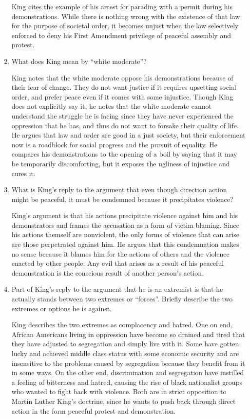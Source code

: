 \documentclass{article}
\begin{document}
\begin{enumerate}
  \par King cites the example of his arrest for parading with a permit during his demonstrations. While there is nothing wrong with the existence of that law for the purpose of societal order, it becomes unjust when the law selectively enforced to deny his First Amendment privilege of peaceful assembly and protest.
  \item What does King mean by ``white moderate''?
  \par King notes that the white moderate oppose his demonstrations because of their fear of change. They do not want justice if it requires upsetting social order, and prefer peace even if it comes with some injustice. Though King does not explicitly say it, he notes that the white moderate cannot understand the struggle he is facing since they have never experienced the oppression that he has, and thus do not want to forsake their quality of life. He argues that law and order are good in a just society, but their enforcement now is a roadblock for social progress and the pursuit of equality. He compares his demonstrations to the opening of a boil by saying that it may be temporarily discomforting, but it exposes the ugliness of injustice and cures it.
  \item What is King's reply to the argument that even though direction action might be peaceful, it must be condemned because it precipitates violence?
  \par King's argument is that his actions precipitate violence against him and his demonstrators and frames the accusation as a form of victim blaming. Since his actions themself are nonviolent, the only forms of violence that can arise are those perpetrated against him. He argues that this condemnation makes no sense because it blames him for the actions of others and the violence enacted by other people. Any evil that arises as a result of his peaceful demonstration is the conscious result of another person's action.
  \item Part of King's reply to the argument that he is an extremist is that he actually stands between two extremes or ``forces''. Briefly describe the two extremes or options he is against.
  \par King describes the two extremes as complacency and hatred. One on end, African Americans living in oppression have become so drained and tired that they have adjusted to segregation and simply live with it. Some have gotten lucky and achieved middle class status with some economic security and are insensitive to the problems caused by segregation because they benefit from it in some ways. On the other end, discrimination and segregation have instilled a feeling of bitterness and hatred, causing the rise of black nationalist groups who wanted to fight back with violence. Both are in strict opposition to Martin Luther King's doctrine, since he wants to push back through direct action in the form peaceful protest and demonstration.

\end{enumerate}
\end{document}
